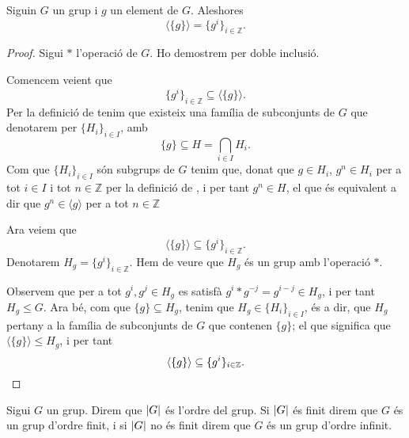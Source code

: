 \documentclass[../../Main.tex]{subfiles}
\begin{document}
	\begin{proposition}
		\label{prop:forma grups cíclics}
		Siguin \(G\) un grup i \(g\) un element de \(G\). Aleshores
		\[\langle\{g\}\rangle=\{g^{i}\}_{i\in\mathbb{Z}}.\]
		\begin{proof}
			Sigui \(\ast\) l'operació de \(G\). Ho demostrem per doble inclusió.
			
			Comencem veient que
			\[\{g^{i}\}_{i\in\mathbb{Z}}\subseteq\langle\{g\}\rangle.\]
			Per la definició de  tenim que existeix una família de subconjunts de \(G\) que denotarem per \(\{H_{i}\}_{i\in I}\), amb
			\[\{g\}\subseteq H=\bigcap_{i\in I}H_{i}.\]
			Com que \(\{H_{i}\}_{i\in I}\) són subgrups de \(G\) tenim que, donat que \(g\in H_{i}\), \(g^{n}\in H_{i}\) per a tot \(i\in I\) i tot \(n\in\mathbb{Z}\) per la definició de , i per tant \(g^{n}\in H\), el que és equivalent a dir que \(g^{n}\in \langle g\rangle\) per a tot \(n\in\mathbb{Z}\)
			
			Ara veiem que
			\[\langle\{g\}\rangle\subseteq\{g^{i}\}_{i\in\mathbb{Z}}.\]
			Denotarem \(H_{g}=\{g^{i}\}_{i\in\mathbb{Z}}\). Hem de veure que \(H_{g}\) és un grup amb l'operació \(\ast\).
			
			Observem que per a tot \(g^{i},g^{j}\in H_{g}\) es satisfà \(g^{i}\ast g^{-j}=g^{i-j}\in H_{g}\), i per tant \(H_{g}\leq G\). Ara bé, com que \(\{g\}\subseteq H_{g}\), tenim que \(H_{g}\in\{H_{i}\}_{i\in I}\), és a dir, que \(H_{g}\) pertany a la família de subconjunts de \(G\) que contenen \(\{g\}\); el que significa que \(\langle\{g\}\rangle\leq H_{g}\), i per tant \[\langle\{g\}\rangle\subseteq\{g^{i}\}_{i\in\mathbb{Z}}.\qedhere\]
		\end{proof}
	\end{proposition}
	\begin{definition}
		\label{def:ordre d'un grup}
		Sigui \(G\) un grup. Direm que \(\abs{G}\) és l'ordre del grup.
		Si \(\abs{G}\) és finit direm que \(G\) és un grup d'ordre finit, i si \(\abs{G}\) no és finit direm que \(G\) és un grup d'ordre infinit.
	\end{definition}
\end{document}

